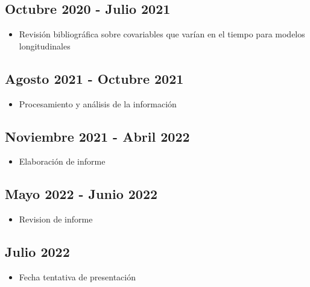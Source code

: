 \documentclass[12pt]{article}
\begin{document}
\subsection*{Octubre 2020 - Julio 2021}
\begin{itemize}
	\item Revisión bibliográfica sobre covariables que varían en el tiempo para modelos longitudinales
\end{itemize}

\subsection*{Agosto 2021 - Octubre 2021}
\begin{itemize}
	\item Procesamiento y análisis de la información 
\end{itemize}

\subsection*{Noviembre 2021 - Abril 2022}
\begin{itemize}
	\item Elaboración de informe
\end{itemize}

\subsection*{Mayo 2022 - Junio 2022}
\begin{itemize}
	\item Revision de informe
\end{itemize}

\subsection*{Julio 2022}
\begin{itemize}
	\item Fecha tentativa de presentación
\end{itemize}

\newpage
\nocite{*}
\renewcommand{\refname}{Bibliografía}

\end{document}
